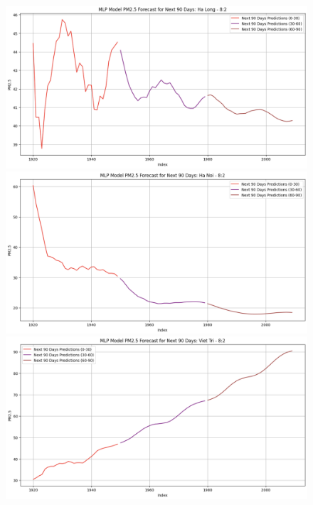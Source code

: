 \begin{figure}[H]
    \begin{minipage}{0.15\textwidth}
        \centering
        \includegraphics[width=1\textwidth]{img/final/MLP/90D/MLP_8_2_HL_90D.png}
        \end{minipage}
        \hfill
        \begin{minipage}{0.15\textwidth}
        \centering
        \includegraphics[width=1\textwidth]{img/final/MLP/90D/MLP_8_2_HN_90D.png}
        \end{minipage}
        \hfill
        \begin{minipage}{0.15\textwidth}
        \centering
        \includegraphics[width=1\textwidth]{img/final/MLP/90D/MLP_8_2_VT_90D.png}
        \end{minipage}
        \hfill


\end{figure}
